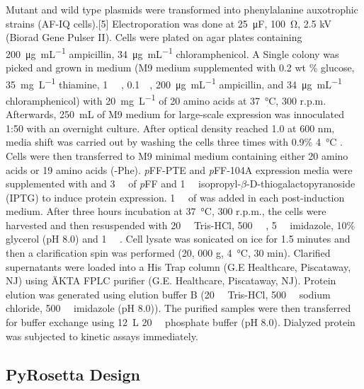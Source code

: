 \begin{refsection}
Mutant and wild type plasmids were transformed into  phenylalanine
auxotrophic strains (AF-IQ cells).[5] Electroporation was done at
\SI{25}{\micro\farad}, \SI{100}{\ohm}, 2.5 kV (Biorad Gene Pulser II). Cells were
plated on agar plates containing \SI{200}{\ug\per\mL} ampicillin, \SI{34}{\ug\per\mL}
chloramphenicol. A Single colony was picked and grown in medium (M9 medium
supplemented with 0.2 wt \% glucose, \SI{35}{\mg\per\L} thiamine, \SI{1}{\milli\Molar}
, \SI{0.1}{\milli\Molar}, \SI{200}{\ug\per\mL} ampicillin, and
\SI{34}{\ug\per\mL} chloramphenicol) with \SI{20}{\mg\per\L} of 20 amino acids
at \SI{37}{\celsius}, 300 r.p.m.  Afterwards, \SI{250}{\mL} of M9 medium for
large-scale expression was innoculated 1:50 with an overnight culture.  After
optical density reached 1.0 at 600 nm, media shift was carried out by washing
the cells three times with 0.9\% \SI{4}{\celsius} .  Cells were then
transferred to M9 minimal medium containing either 20 amino acids or 19 amino
acids (-Phe). \emph{p}FF-PTE and \emph{p}FF-104A expression media were
supplemented with and \SI{3}{\milli\Molar} of \emph{p}FF and
\SI{1}{\milli\Molar} isopropyl-$\beta$-D-thiogalactopyranoside (IPTG) to induce
protein expression.  \SI{1}{\milli\Molar} of  was added in each
post-induction medium. After three hours incubation at \SI{37}{\celsius}, 300
r.p.m., the cells were harvested and then resuspended with
\SI{20}{\milli\Molar} Tris-HCl, \SI{500}{\milli\Molar} ,
\SI{5}{\milli\Molar} imidazole, 10\% glycerol (pH 8.0) and \SI{1}{\micro\Molar}
. Cell lysate was sonicated on ice for 1.5 minutes and then a
clarification spin was performed (20, 000 g, \SI{4}{\celsius}, 30 min).
Clarified supernatants were loaded into a His Trap column (G.E Healthcare,
Piscataway, NJ) using ÄKTA FPLC purifier (G.E.  Healthcare, Piscataway, NJ).
Protein elution was generated using elution buffer B (\SI{20}{\milli\Molar}
Tris-HCl, \SI{500}{\milli\Molar} sodium chloride, \SI{500}{\milli\Molar}
imidazole (pH 8.0)).  The purified samples were then transferred for buffer
exchange using \SI{12}{\L} \SI{20}{\milli\Molar} phosphate buffer (pH 8.0).
Dialyzed protein was subjected to kinetic assays immediately.

\subsection{PyRosetta Design}
\label{sec:rosetta}


\end{refsection}
